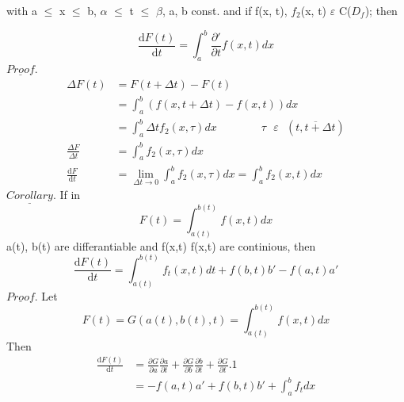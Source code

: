 \documentclass[11pt]{amsbook}
\begin{document}
	
with a $\leq$ x $\leq$ b, $\alpha$ $\leq$ t $\leq$ $\beta$,  a,  b const. and if  f(x, t), 
$f_2$(x, t) $\varepsilon$ C($D_f$); then

\begin{equation*}
\frac{\mathrm{d} F(t)}{\mathrm{d} t}=\int_{a}^{b} \frac{\partial' }{\partial t}f(x, t)dx
\end{equation*}
$\underline{Proof}$.
\begin{equation*}
\begin{split}
 \Delta F(t) & = F(t + \Delta t) - F(t) \\
& = \int_{a}^{b} (f(x, t + \Delta t) - f(x, t))dx \\
& = \int_{a}^{b} \Delta t f_2(x,\tau)dx \quad  \quad  \quad  \quad
\textrm{$\tau$  $\varepsilon$  $(\overline{t, t + \Delta t})$} \\
\frac{\Delta F}{\Delta t} &= \int_{a}^{b} f_2(x, \tau)dx\\
\frac{\mathrm{d} F}{\mathrm{d} t} & = \lim_{\Delta t \to 0} \int_{a}^{b} f_2 (x,\tau )dx = \int_{a}^{b} f_2(x,t)dx
\end{split}
\end{equation*}
$\underline{Corollary}$. If in 
\begin{equation*}
F(t) = \int_{a(t)}^{b(t)} f(x, t)dx
\end{equation*}
a(t), b(t) are differantiable and  f(x,t) f(x,t) are 
continious, then 
\begin{equation*}
\frac{\mathrm{d} F(t)}{\mathrm{d} t} = \int_{a(t)}^{b(t)}f_t(x,t)dt+f(b,t)b'-f(a,t)a'
\end{equation*}
$\underline{Proof}$. Let
\begin{equation*}
F(t) = G(a(t), b(t), t) = \int_{a(t)}^{b(t)}f(x,t)dx
\end{equation*}
Then
\begin{equation*}
\begin{split}
\frac{\mathrm{d} F(t)}{\mathrm{d} t}  & = \frac{\partial G}{\partial a}\frac{\partial a}{\partial t}+ \frac{\partial G}{\partial b}\frac{\partial b}{\partial t}+ \frac{\partial G}{\partial t}.1 \\
 & = -f(a,t)a' + f(b,t)b'+\int_{a}^{b}f_tdx
\end{split}
\end{equation*}
\end{document}
